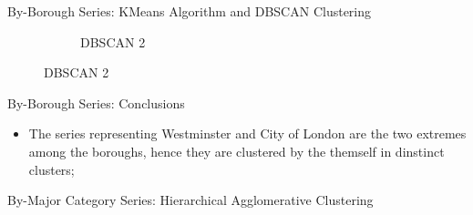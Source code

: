 \documentclass[12pt]{beamer}
\begin{document}
\begin{frame}{By-Borough Series: KMeans Algorithm and DBSCAN Clustering}
\begin{figure}
\begin{subfigure}{0.20\textwidth}
{                    }
                    \caption{DBSCAN 2}
                \end{subfigure}
            \end{figure}
        \end{frame}

        \begin{frame}{By-Borough Series: Conclusions}
            \begin{itemize}
                \item The series representing Westminster and City of London are the two extremes among
                the boroughs, hence they are clustered by the themself in dinstinct clusters;
            \end{itemize}
        \end{frame}

        \begin{frame}{By-Major Category Series: Hierarchical Agglomerative Clustering}
            \begin{figure}
                \centering
            \end{figure}
        \end{frame}
\end{document}
